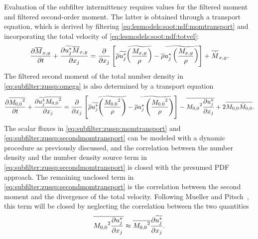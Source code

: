 Evaluation of the subfilter intermittency requires values for the filtered moment and filtered second-order moment. The latter is obtained through a transport equation, which is derived by filtering \cref{eq:lesmodels:soot:ndf:momtransport} and incorporating the total velocity of \cref{eq:lesmodels:soot:ndf:totvel}:
\begin{equation}\label{eq:subfilter:zussp:momtransport}
  \pder[\mean{M}_{x,y}]{t} + \pder[\tf{u_j^*}\mean{M}_{x,y}]{x_j} = \pder[]{x_j}\left[ \mean{\rho}\tf{u_j^*}\tf{ \left( \frac{M_{x,y}}{\rho} \right)} - \mean{\rho}\tf{u_j^* \left( \frac{M_{x,y}}{\rho}\right)} \right] + \mean{\dot{M}}_{x,y}.
\end{equation}
The filtered second moment of the total number density in \cref{eq:subfilter:zussp:omega} is also determined by a transport equation
\begin{equation}\label{eq:subfilter:zussp:secondmomtransport}
  \pder[\mean{{M_{0,0}}^2}]{t} + \pder[\tf{u_j^*}\mean{{M_{0,0}}^2}]{x_j} = \pder[]{x_j}\left[ \mean{\rho}\tf{u_j^*}\tf{\left( \frac{{M_{0,0}}^2}{\rho} \right)} - \mean{\rho}\tf{u_j^* \left( \frac{{M_{0,0}}^2}{\rho} \right)} \right] - \mean{{M_{0,0}}^2 \pder[u_j^*]{x_j}} + 2\mean{M_{0,0}\dot{M}_{0,0}}.
\end{equation}
The scalar fluxes in \cref{eq:subfilter:zussp:momtransport} and \cref{eq:subfilter:zussp:secondmomtransport} can be modeled with a dynamic procedure as previously discussed, and the correlation between the number density and the number density source term in \cref{eq:subfilter:zussp:secondmomtransport} is closed with the presumed PDF approach. The remaining unclosed term in \cref{eq:subfilter:zussp:secondmomtransport} is the correlation between the second moment and the divergence of the total velocity. Following Mueller and Pitsch~\cite{subfilterpdf2011}, this term will be closed by neglecting the correlation between the two quantities
\begin{equation}\label{eq:subfilter:zussp:nocorrelation}
  \mean{{M_{0,0}}^2 \pder[u_j^*]{x_j}} \approx \mean{{M_{0,0}}^2}\pder[\tf{u_j^*}]{x_j}.
\end{equation}
